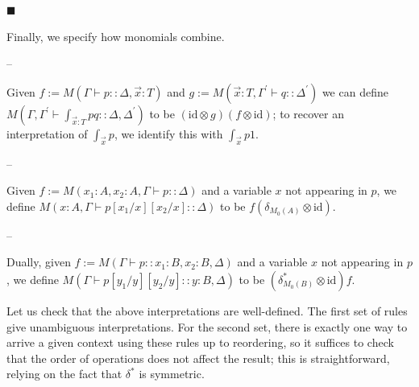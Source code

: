 \documentclass[10pt,a4paper]{amsart}
\begin{document}
  
 
 
\par\noindent  $\blacksquare$ 
 
Finally, we specify how monomials combine.\par
  
\par\noindent  – 
 
Given $f:=M(\Gamma\vdash p::\Delta,\vec{x}:T)$ and $g:=M(\vec{x}:T,\Gamma^{\prime}\vdash q::\Delta^{\prime})$ we can define $M\left(\Gamma,\Gamma^{\prime}\vdash\int_{\vec{x}:T}pq::\Delta,\Delta^{\prime}\right)$ to be $(\mathrm{id}\otimes g)(f\otimes\mathrm{id})$; to recover an interpretation of $\int_{\vec{x}}p$, we identify this with $\int_{\vec{x}}p1$.\par
 
 
 
\par\noindent  – 
 
Given $f:=M(x_{1}:A,x_{2}:A,\Gamma\vdash p::\Delta)$ and a variable $x$ not appearing in $p$, we define $M(x:A,\Gamma\vdash p[x_{1}/x][x_{2}/x]::\Delta)$ to be $f(\delta_{M_{0}(A)}\otimes\mathrm{id})$.\par
 
 
 
\par\noindent  – 
 
Dually, given $f:=M(\Gamma\vdash p::x_{1}:B,x_{2}:B,\Delta)$ and a variable $x$ not appearing in $p$, we define $M(\Gamma\vdash p[y_{1}/y][y_{2}/y]::y:B,\Delta)$ to be $(\delta^{*}_{M_{0}(B)}\otimes\mathrm{id})f$.\par
 
 
  
 
  
 
 
Let us check that the above interpretations are well-defined. The first set of rules give unambiguous interpretations. For the second set, there is exactly one way to arrive a given context using these rules up to reordering, so it suffices to check that the order of operations does not affect the result; this is straightforward, relying on the fact that $\delta^{*}$ is symmetric.\par
 
 
\end{document}
